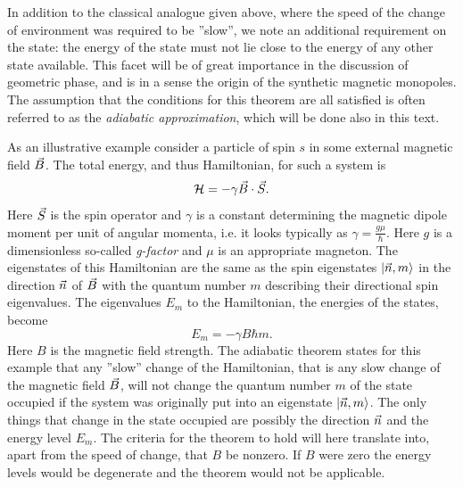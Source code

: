 \documentclass[main.tex]{subfiles}
\begin{document}
In addition to the classical analogue given above, where the speed of the change of
environment was required to be ''slow'', we note an additional requirement on the state: the
energy of the state must not lie close to the energy of any other state available. This
facet will be of great importance in the discussion of geometric phase, and is in a sense the
origin of the synthetic magnetic monopoles. The assumption that the conditions for this
theorem are all satisfied is often referred to as the \textit{adiabatic approximation},
which will be done also in this text.

As an illustrative example consider a particle of spin \(s\) in some external magnetic
field \(\vec{B}\). The total energy, and thus Hamiltonian, for such a system is \[
\mathbb{\cal H} = -\gamma \vec{B}\cdot \vec{S}
.\] 
Here \(\vec{S}\) is the spin operator and \(\gamma\) is a constant determining the magnetic
dipole moment per unit of angular momenta, i.e. it looks typically as \(\gamma =
\frac{g\mu}{\hbar{}}\). Here \(g\) is a dimensionless so-called \textit{g-factor} and
\(\mu\) is an appropriate magneton. The eigenstates of this Hamiltonian are the same as the
spin eigenstates \(\ket{\vec{n}, m}\) in the direction \(\vec{n}\) of \(\vec{B}\) with the
quantum number \(m\) describing their directional spin eigenvalues. The eigenvalues \(E_m\) to the
Hamiltonian, the energies of the states, become \[
E_m = -\gamma B \hbar{} m
.\] 
Here \(B\) is the magnetic field strength. The adiabatic theorem states for this
example that any ''slow'' change of the Hamiltonian, that is any slow change of the
magnetic field \(\vec{B}\), will not change the quantum number \(m\) of the state occupied
if the system was originally
put into an eigenstate \(\ket{\vec{n}, m}\). The only things that change in the state
occupied are
possibly the direction \(\vec{n}\) and the energy level \(E_m\). The criteria for the
theorem to hold will here translate into, apart from the speed of change, that \(B\) be
nonzero. If \(B\) were zero the energy levels would be degenerate and the theorem would not be applicable.
\end{document}
